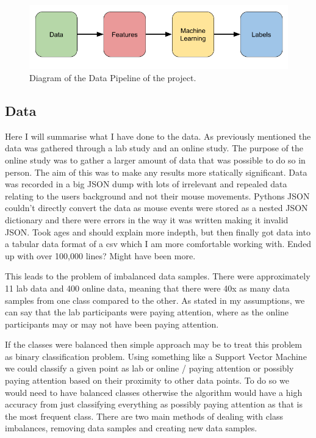 \documentclass{article}
\begin{document}
\begin{figure}[ht]
    \centering
    \includegraphics[scale=0.55]{Images/Data-Pipeline.png}
    \caption{Diagram of the Data Pipeline of the project.}
    \label{fig:test}
\end{figure}


\subsection{Data}


Here I will summarise what I have done to the data.
As previously mentioned the data was gathered through a lab study and an online study.
The purpose of the online study was to gather a larger amount of data that was possible to do so in person.
The aim of this was to make any results more statically significant.
Data was recorded in a big JSON dump with lots of irrelevant and repealed data relating to the users background and not their mouse movements.
Pythons JSON couldn't directly convert the data as mouse events were stored as a nested JSON dictionary and there were errors in the way it was written making it invalid JSON.
Took ages and should explain more indepth, but then finally got data into a tabular data format of a csv which I am more comfortable working with.
Ended up with over 100,000 lines? Might have been more. 

This leads to the problem of imbalanced data samples.
There were approximately 11 lab data and 400 online data, meaning that there were 40x as many data samples from one class compared to the other.
As stated in my assumptions, we can say that the lab participants were paying attention, where as the online participants may or may not have been paying attention.

If the classes were balanced then simple approach may be to treat this problem as binary classification problem.
Using something like a Support Vector Machine we could classify a given point as lab or online / paying attention or possibly paying attention based on their proximity to other data points.
To do so we would need to have balanced classes otherwise the algorithm would have a high accuracy from just classifying everything as possibly paying attention as that is the most frequent class.
There are two main methods of dealing with class imbalances, removing data samples and creating new data samples.
\end{document}
